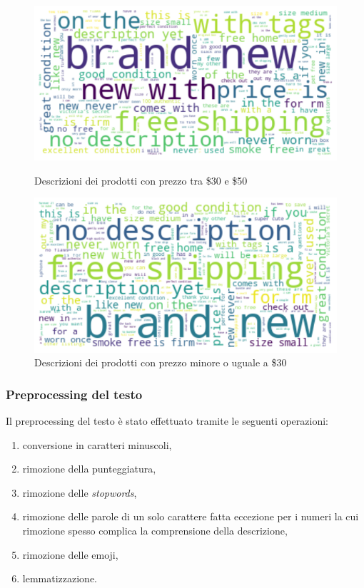 \begin{figure}[H]
   \begin{minipage}{0.48\textwidth}
     \centering
     \includegraphics[width=.9\linewidth]{30_50}
	\caption{Descrizioni dei prodotti con prezzo tra \$30 e \$50}
	\label{fig:30_50}   
	\end{minipage}\hfill
   \begin{minipage}{0.48\textwidth}
     \centering
     \includegraphics[width=.9\linewidth]{minore_30}
     \caption{Descrizioni dei prodotti con prezzo minore o uguale a \$30}
     \label{Fig:minore_30}
   \end{minipage}
\end{figure}

\subsubsection{Preprocessing del testo}

Il preprocessing del testo è stato effettuato tramite le seguenti operazioni:
\begin{enumerate}
    \item conversione in caratteri minuscoli,
    \item rimozione della punteggiatura,
    \item rimozione delle \textit{stopwords},
    \item rimozione delle parole di un solo carattere fatta eccezione per i
    numeri la cui rimozione spesso complica la comprensione della descrizione,
    \item rimozione delle emoji,
    \item lemmatizzazione.
\end{enumerate}

